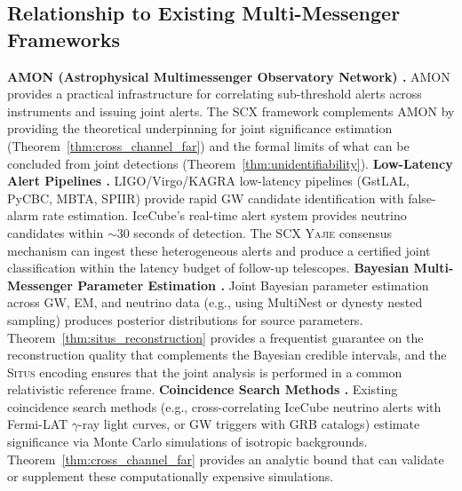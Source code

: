 \documentclass[11pt,a4paper]{article}
\theoremstyle{definition}
\newcommand{\Situs}{\textsc{Situs}}
\newcommand{\Yajie}{\textsc{Yajie}}
\newcommand{\SCX}{\textsc{SCX}}
\begin{document}
\subsection{Relationship to Existing Multi-Messenger Frameworks}
\textbf{AMON (Astrophysical Multimessenger Observatory Network) \cite{AMON2015}.} AMON provides a practical infrastructure for correlating sub-threshold alerts across instruments and issuing joint alerts. The \SCX{} framework complements AMON by providing the theoretical underpinning for joint significance estimation (Theorem~\ref{thm:cross_channel_far}) and the formal limits of what can be concluded from joint detections (Theorem~\ref{thm:unidentifiability}).
\textbf{Low-Latency Alert Pipelines \cite{LIGOAlert2021}.} LIGO/Virgo/KAGRA low-latency pipelines (GstLAL, PyCBC, MBTA, SPIIR) provide rapid GW candidate identification with false-alarm rate estimation. IceCube's real-time alert system \cite{IceCubeAlert2016} provides neutrino candidates within $\sim 30$ seconds of detection. The \SCX{} \Yajie{} consensus mechanism can ingest these heterogeneous alerts and produce a certified joint classification within the latency budget of follow-up telescopes.
\textbf{Bayesian Multi-Messenger Parameter Estimation \cite{MultiMessengerPE2020}.} Joint Bayesian parameter estimation across GW, EM, and neutrino data (e.g., using MultiNest or dynesty nested sampling) produces posterior distributions for source parameters. Theorem~\ref{thm:situs_reconstruction} provides a frequentist guarantee on the reconstruction quality that complements the Bayesian credible intervals, and the \Situs{} encoding ensures that the joint analysis is performed in a common relativistic reference frame.
\textbf{Coincidence Search Methods \cite{CoincidenceSearch2021}.} Existing coincidence search methods (e.g., cross-correlating IceCube neutrino alerts with Fermi-LAT $\gamma$-ray light curves, or GW triggers with GRB catalogs) estimate significance via Monte Carlo simulations of isotropic backgrounds. Theorem~\ref{thm:cross_channel_far} provides an analytic bound that can validate or supplement these computationally expensive simulations.
\end{document}
